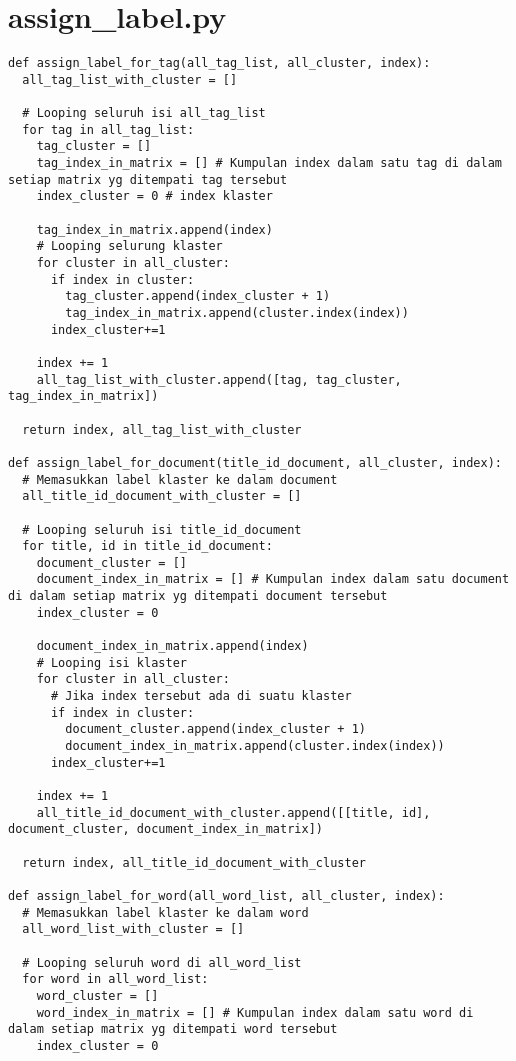 \chapter{assign\_label.py}
\begin{lstlisting}[breaklines=true]
def assign_label_for_tag(all_tag_list, all_cluster, index):
  all_tag_list_with_cluster = []
  
  # Looping seluruh isi all_tag_list
  for tag in all_tag_list:
    tag_cluster = []
    tag_index_in_matrix = [] # Kumpulan index dalam satu tag di dalam setiap matrix yg ditempati tag tersebut
    index_cluster = 0 # index klaster
    
    tag_index_in_matrix.append(index)
    # Looping selurung klaster
    for cluster in all_cluster:
      if index in cluster:
        tag_cluster.append(index_cluster + 1)
        tag_index_in_matrix.append(cluster.index(index))
      index_cluster+=1
      
    index += 1
    all_tag_list_with_cluster.append([tag, tag_cluster, tag_index_in_matrix])
  
  return index, all_tag_list_with_cluster
  
def assign_label_for_document(title_id_document, all_cluster, index):
  # Memasukkan label klaster ke dalam document
  all_title_id_document_with_cluster = []
  
  # Looping seluruh isi title_id_document
  for title, id in title_id_document:
    document_cluster = []
    document_index_in_matrix = [] # Kumpulan index dalam satu document di dalam setiap matrix yg ditempati document tersebut
    index_cluster = 0

    document_index_in_matrix.append(index)
    # Looping isi klaster
    for cluster in all_cluster:
      # Jika index tersebut ada di suatu klaster
      if index in cluster:
        document_cluster.append(index_cluster + 1)
        document_index_in_matrix.append(cluster.index(index))
      index_cluster+=1

    index += 1
    all_title_id_document_with_cluster.append([[title, id], document_cluster, document_index_in_matrix])

  return index, all_title_id_document_with_cluster

def assign_label_for_word(all_word_list, all_cluster, index):
  # Memasukkan label klaster ke dalam word
  all_word_list_with_cluster = []
  
  # Looping seluruh word di all_word_list
  for word in all_word_list:
    word_cluster = []
    word_index_in_matrix = [] # Kumpulan index dalam satu word di dalam setiap matrix yg ditempati word tersebut
    index_cluster = 0
    

\end{lstlisting}
